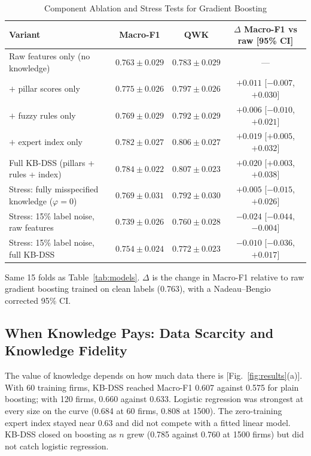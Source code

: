\documentclass[10pt,journal,compsoc]{IEEEtran}
\begin{document}
\begin{table}[!t]
\caption{Component Ablation and Stress Tests for Gradient Boosting}
\label{tab:ablation}
\centering
\setlength{\tabcolsep}{6pt}
\scriptsize
\begin{tabular*}{\textwidth}{@{\extracolsep{\fill}}lccc}
\toprule
Variant & Macro-F1 & QWK & \(\Delta\) Macro-F1 vs raw [95\% CI] \\
\midrule
Raw features only (no knowledge)
  & \(0.763\pm0.029\) & \(0.783\pm0.029\) & --- \\
\(+\) pillar scores only
  & \(0.775\pm0.026\) & \(0.797\pm0.026\) & \(+0.011\) [\(-0.007\), \(+0.030\)] \\
\(+\) fuzzy rules only
  & \(0.769\pm0.029\) & \(0.792\pm0.029\) & \(+0.006\) [\(-0.010\), \(+0.021\)] \\
\(+\) expert index only
  & \(0.782\pm0.027\) & \(0.806\pm0.027\) & \(+0.019\) [\(+0.005\), \(+0.032\)] \\
Full KB-DSS (pillars + rules + index)
  & \(0.784\pm0.022\) & \(0.807\pm0.023\) & \(+0.020\) [\(+0.003\), \(+0.038\)] \\
Stress: fully misspecified knowledge (\(\varphi=0\))
  & \(0.769\pm0.031\) & \(0.792\pm0.030\) & \(+0.005\) [\(-0.015\), \(+0.026\)] \\
Stress: 15\% label noise, raw features
  & \(0.739\pm0.026\) & \(0.760\pm0.028\) & \(-0.024\) [\(-0.044\), \(-0.004\)] \\
Stress: 15\% label noise, full KB-DSS
  & \(0.754\pm0.024\) & \(0.772\pm0.023\) & \(-0.010\) [\(-0.036\), \(+0.017\)] \\
\bottomrule
\end{tabular*}
\vspace{2pt}

{\raggedright\scriptsize Same 15 folds as Table~\ref{tab:models}. \(\Delta\) is the change in Macro-F1 relative to raw gradient boosting trained on clean labels (0.763), with a Nadeau--Bengio corrected 95\% CI.\par}
\end{table}

\subsection{When Knowledge Pays: Data Scarcity and Knowledge Fidelity}

The value of knowledge depends on how much data there is [Fig.~\ref{fig:results}(a)]. With 60 training firms, KB-DSS reached Macro-F1 0.607 against 0.575 for plain boosting; with 120 firms, 0.660 against 0.633. Logistic regression was strongest at every size on the curve (0.684 at 60 firms, 0.808 at 1500). The zero-training expert index stayed near 0.63 and did not compete with a fitted linear model. KB-DSS closed on boosting as \(n\) grew (0.785 against 0.760 at 1500 firms) but did not catch logistic regression.
\end{document}
